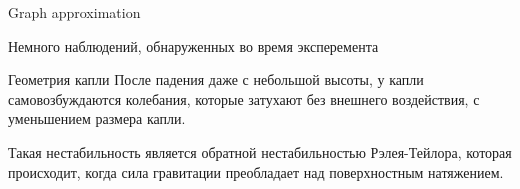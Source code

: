 \begin{frame}{Graph approximation}
\end{frame}
 \begin{frame}{Немного наблюдений, обнаруженных во время эксперемента}
  \begin{block}{Геометрия капли}
   После падения даже с небольшой высоты, у капли самовозбуждаются колебания, которые затухают без внешнего воздействия, с уменьшением размера капли. 
  \end{block}   
  \begin{block}{}
      Такая нестабильность является обратной нестабильностью Рэлея-Тейлора, которая происходит, когда сила гравитации преобладает над поверхностным натяжением.
  \end{block}
 \end{frame}

